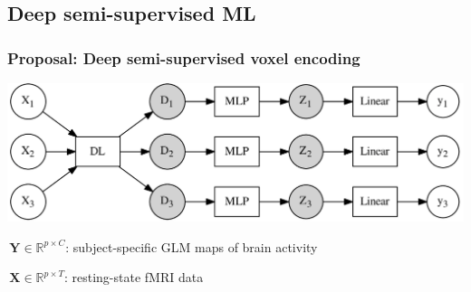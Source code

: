 \documentclass{beamer}
\def\mydot{\structure{\rule{1ex}{1ex}}\,}
\def\B#1{\mathbf{#1}}
\def\emph#1{\textbf{\textcolor{orange}{#1}}}
\begin{document}
\subsection{Deep semi-supervised ML}
\begin{frame}
  \frametitle{Proposal: Deep semi-supervised voxel encoding}
  \includegraphics[width=1.\linewidth]{gen_model.png}

  \bigskip
  
  \mydot $\B{Y} \in \mathbb R^{p \times C}$: subject-specific GLM maps of brain activity

  \bigskip
  
 \mydot $\B{X} \in \mathbb R^{p \times T}$: resting-state fMRI data %

 


  
  
\end{frame}
\end{document}
